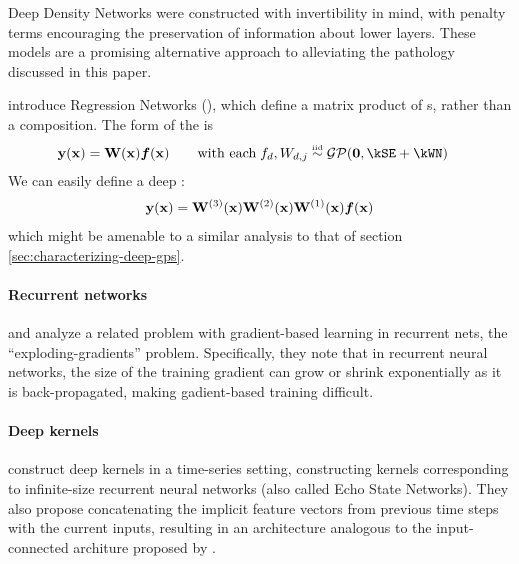 Deep Density Networks \citep{rippel2013high} were constructed with invertibility in mind, with penalty terms encouraging the preservation of information about lower layers.
These models are a promising alternative approach to alleviating the pathology discussed in this paper.

\citet{wilson2012gaussian} introduce \gp{} Regression Networks (\gprn{}), which define a matrix product of \gp{}s, rather than a composition.
The form of the \gprn{} is
%
\begin{align}
\vy(\vx) & = \vW(\vx) \vf(\vx) \qquad \textnormal{with each} \; f_{d}, W_{d,j} \simiid \GPt{\vzero}{\kSE + \kWN}
\end{align}
%
We can easily define a deep \gprn{}:
%
\begin{align}
{\bf{y}}({\bf{x}}) = \mathbf{W}^{(3)}({\bf{x}}) \mathbf{W}^{(2)}({\bf{x}}) \mathbf{W}^{(1)}({\bf{x}}) \boldsymbol{f}({\bf{x}})
\end{align}
%
which might be amenable to a similar analysis to that of section \ref{sec:characterizing-deep-gps}.
%
%
%




\paragraph{Recurrent networks}
\cite{bengio1994learning} and \cite{pascanu2012understanding} analyze a related problem with gradient-based learning in recurrent nets, the ``exploding-gradients'' problem.
Specifically, they note that in recurrent neural networks, the size of the training gradient can grow or shrink exponentially as it is back-propagated, making gadient-based training difficult.

\paragraph{Deep kernels}


\cite{hermans2012recurrent} construct deep kernels in a time-series setting, constructing kernels corresponding to infinite-size recurrent neural networks (also called Echo State Networks).
They also propose concatenating the implicit feature vectors from previous time steps with the current inputs, resulting in an architecture analogous to the input-connected architure proposed by \citet{neal1995bayesian}.

